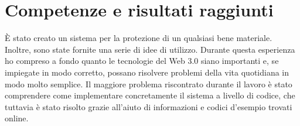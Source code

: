 \documentclass[a4paper, 12pt, italian]{extarticle}
\begin{document}
\section{Competenze e risultati raggiunti}
È stato creato un sistema per la protezione di un qualsiasi bene materiale. Inoltre, sono state fornite una serie di idee di utilizzo.\newline
Durante questa esperienza ho compreso a fondo quanto le tecnologie del Web 3.0 siano importanti e, se impiegate in modo corretto, possano risolvere problemi della vita quotidiana in modo molto semplice.\newline
Il maggiore problema riscontrato durante il lavoro è stato comprendere come implementare concretamente il sistema a livello di codice, che tuttavia è stato risolto grazie all'aiuto di informazioni e codici d'esempio trovati online.
\end{document}
